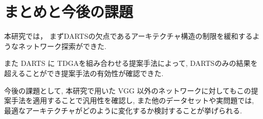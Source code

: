 \newpage
\changeindent{0cm}
\section{まとめと今後の課題}
\label{sec:conclusion}
\changeindent{2cm}

本研究では，
まずDARTSの欠点であるアーキテクチャ構造の制限を緩和するようなネットワーク探索ができた.

また
DARTS に TDGAを組み合わせる提案手法によって,
DARTSのみの結果を超えることができ提案手法の有効性が確認できた.


今後の課題として,
本研究で用いた VGG 以外のネットワークに対してもこの提案手法を適用することで汎用性を確認し,
また他のデータセットや実問題では, 最適なアーキテクチャがどのように変化するか検討することが挙げられる.


